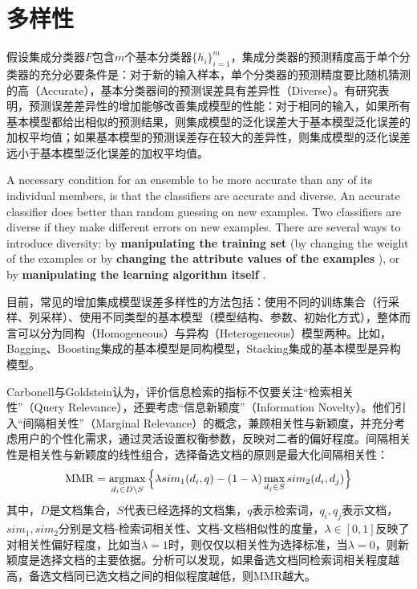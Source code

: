 \ornamento
\section{多样性}\label{sec:diverisity}
假设集成分类器$F$包含$m$个基本分类器$\{h_i\}_{i=1}^m$，集成分类器的预测精度高于单个分类器的充分必要条件\cite{hansen1990neural}是：对于新的输入样本，单个分类器的预测精度要比随机猜测的高（Accurate），基本分类器间的预测误差具有差异性（Diverse）\cite{dietterich2000ensemble}。有研究表明，预测误差差异性的增加能够改善集成模型的性能：对于相同的输入，如果所有基本模型都给出相似的预测结果，则集成模型的泛化误差大于基本模型泛化误差的加权平均值；如果基本模型的预测误差存在较大的差异性，则集成模型的泛化误差远小于基本模型泛化误差的加权平均值。

A necessary condition for an ensemble to be more accurate than any of its individual members, is that the classifiers are accurate and diverse\cite{hansen1990neural}. An accurate classifier does better than random guessing on new examples. Two classifiers are diverse if they make different errors on new examples. There are several ways to introduce diversity: by \textbf{manipulating the training set} (by changing the weight of the examples\cite{breiman1996bagging,freund1996experiments} or by \textbf{changing the attribute values of the examples} \cite{breiman1999using}), or by \textbf{manipulating the learning algorithm itself} \cite{dietterich2000ensemble}.

目前，常见的增加集成模型误差多样性的方法包括：使用不同的训练集合（行采样、列采样）、使用不同类型的基本模型（模型结构、参数、初始化方式），整体而言可以分为同构（Homogeneous）与异构（Heterogeneous）模型两种。比如，Bagging、Boosting集成的基本模型是同构模型，Stacking集成的基本模型是异构模型。

Carbonell与Goldstein\cite{carbonell1998use}认为，评价信息检索的指标不仅要关注“检索相关性”（Query Relevance），还要考虑“信息新颖度”（Information Novelty）。他们引入“间隔相关性”（Marginal Relevance）的概念，兼顾相关性与新颖度，并充分考虑用户的个性化需求，通过灵活设置权衡参数，反映对二者的偏好程度。间隔相关性是相关性与新颖度的线性组合，选择备选文档的原则是最大化间隔相关性：
\begin{equation}\label{eq:mmr}
    \mathrm{MMR} = \operatorname*{\mathrm{\arg\!\max}}\limits_{d_i\in D\setminus S}\Big\{\lambda sim_1(d_i, q) - (1-\lambda) \max\limits_{d_j\in S}sim_2(d_i, d_j)\Big\}
\end{equation}
其中，$D$是文档集合，$S$代表已经选择的文档集，$q$表示检索词，$q_i,q_j$表示文档，$sim_1,sim_2$分别是文档-检索词相关性、文档-文档相似性的度量，$\lambda\in [0,1]$反映了对相关性偏好程度，比如当$\lambda=1$时，则仅仅以相关性为选择标准，当$\lambda = 0$，则新颖度是选择文档的主要依据。分析可以发现，如果备选文档同检索词相关程度越高，备选文档同已选文档之间的相似程度越低，则MMR越大。


